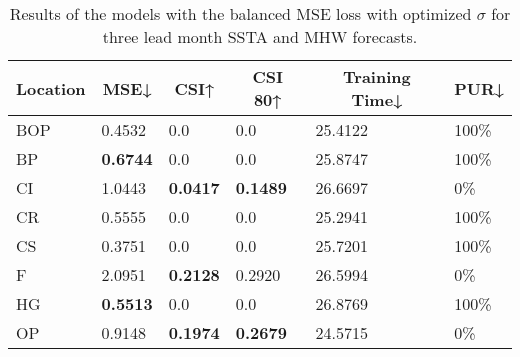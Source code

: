 \documentclass[11pt, a4paper]{article}
\begin{document}
\begin{table}[H]
\centering
\small
\caption{Results of the models with the balanced MSE loss with optimized $\sigma$ for three lead month SSTA and MHW forecasts.}
\begin{tabular}{llllll}
\multicolumn{1}{c}{\textbf{Location}} & \multicolumn{1}{c}{\textbf{MSE↓}} & \multicolumn{1}{c}{\textbf{CSI↑}} & \multicolumn{1}{c}{\textbf{CSI 80↑}} & \multicolumn{1}{c}{\textbf{Training Time↓}} & \multicolumn{1}{c}{\textbf{PUR↓}} \\ \hline
BOP                         & 0.4532                            & 0.0                               & 0.0                                  & 25.4122                                     & 100\%                             \\
BP                        & \textbf{0.6744}                   & 0.0                               & 0.0                                  & 25.8747                                     & 100\%                             \\
CI                        & 1.0443                            & \textbf{0.0417}                   & \textbf{0.1489}                      & 26.6697                                     & 0\%                               \\
CR                           & 0.5555                            & 0.0                               & 0.0                                  & 25.2941                                     & 100\%                             \\
CS                           & 0.3751                            & 0.0                               & 0.0                                  & 25.7201                                     & 100\%                             \\
F                             & 2.0951                            & \textbf{0.2128}                   & 0.2920                               & 26.5994                                     & 0\%                               \\
HG                          & \textbf{0.5513}                   & 0.0                               & 0.0                                  & 26.8769                                     & 100\%                             \\
OP                       & 0.9148                            & \textbf{0.1974}                   & \textbf{0.2679}                      & 24.5715                                     & 0\%                               \\

\end{tabular}
\end{table}
\end{document}
